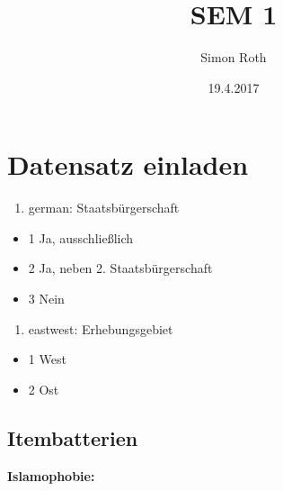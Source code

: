 \documentclass[]{article}
\title{SEM 1}
\author{Simon Roth}
\date{19.4.2017}
\providecommand{\tightlist}{%
  \setlength{\itemsep}{0pt}\setlength{\parskip}{0pt}}
\begin{document}
\maketitle

{
\setcounter{tocdepth}{2}
\tableofcontents
}
\section{Datensatz einladen}\label{datensatz-einladen}

\begin{enumerate}
\def\labelenumi{\alph{enumi}.}
\tightlist
\item
  german: Staatsbürgerschaft
\end{enumerate}

\begin{itemize}
\tightlist
\item
  1 Ja, ausschließlich
\item
  2 Ja, neben 2. Staatsbürgerschaft
\item
  3 Nein
\end{itemize}

\begin{enumerate}
\def\labelenumi{\alph{enumi}.}
\setcounter{enumi}{1}
\tightlist
\item
  eastwest: Erhebungsgebiet
\end{enumerate}

\begin{itemize}
\tightlist
\item
  1 West
\item
  2 Ost
\end{itemize}

\subsection{Itembatterien}\label{itembatterien}

\textbf{Islamophobie:}
\end{document}
